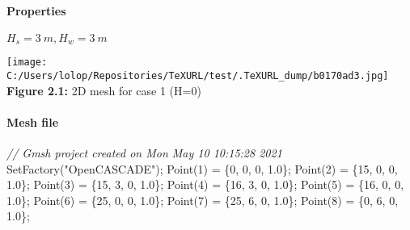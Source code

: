 \documentclass[11pt]{article}
\newenvironment{Shaded}{}{}
\newcommand{\DecValTok}[1]{\textcolor[rgb]{0.25,0.63,0.44}{{#1}}}
\newcommand{\FloatTok}[1]{\textcolor[rgb]{0.25,0.63,0.44}{{#1}}}
\newcommand{\StringTok}[1]{\textcolor[rgb]{0.25,0.44,0.63}{{#1}}}
\newcommand{\CommentTok}[1]{\textcolor[rgb]{0.38,0.63,0.69}{\textit{{#1}}}}
\newcommand{\NormalTok}[1]{{#1}}
\newcommand{\OperatorTok}[1]{\textcolor[rgb]{0.40,0.40,0.40}{{#1}}}
\begin{document}
\hypertarget{properties-1}{%
\paragraph{Properties}\label{properties-1}}

\(H_s = 3\ m, H_w = 3\ m\)

\texttt{[image: C:/Users/lolop/Repositories/TeXURL/test/.TeXURL\_dump/b0170ad3.jpg]} \textbf{Figure 2.1:}
2D mesh for case 1 (H=0)

\hypertarget{mesh-file}{%
\paragraph{Mesh file}\label{mesh-file}}

\begin{Shaded}
\begin{Highlighting}[]
\CommentTok{// Gmsh project created on Mon May 10 10:15:28 2021}
\NormalTok{SetFactory}\OperatorTok{(}\StringTok{"OpenCASCADE"}\OperatorTok{);}
\NormalTok{Point}\OperatorTok{(}\DecValTok{1}\OperatorTok{)} \OperatorTok{=} \OperatorTok{\{}\DecValTok{0}\OperatorTok{,} \DecValTok{0}\OperatorTok{,} \DecValTok{0}\OperatorTok{,} \FloatTok{1.0}\OperatorTok{\};}
\NormalTok{Point}\OperatorTok{(}\DecValTok{2}\OperatorTok{)} \OperatorTok{=} \OperatorTok{\{}\DecValTok{15}\OperatorTok{,} \DecValTok{0}\OperatorTok{,} \DecValTok{0}\OperatorTok{,} \FloatTok{1.0}\OperatorTok{\};}
\NormalTok{Point}\OperatorTok{(}\DecValTok{3}\OperatorTok{)} \OperatorTok{=} \OperatorTok{\{}\DecValTok{15}\OperatorTok{,} \DecValTok{3}\OperatorTok{,} \DecValTok{0}\OperatorTok{,} \FloatTok{1.0}\OperatorTok{\};}
\NormalTok{Point}\OperatorTok{(}\DecValTok{4}\OperatorTok{)} \OperatorTok{=} \OperatorTok{\{}\DecValTok{16}\OperatorTok{,} \DecValTok{3}\OperatorTok{,} \DecValTok{0}\OperatorTok{,} \FloatTok{1.0}\OperatorTok{\};}
\NormalTok{Point}\OperatorTok{(}\DecValTok{5}\OperatorTok{)} \OperatorTok{=} \OperatorTok{\{}\DecValTok{16}\OperatorTok{,} \DecValTok{0}\OperatorTok{,} \DecValTok{0}\OperatorTok{,} \FloatTok{1.0}\OperatorTok{\};}
\NormalTok{Point}\OperatorTok{(}\DecValTok{6}\OperatorTok{)} \OperatorTok{=} \OperatorTok{\{}\DecValTok{25}\OperatorTok{,} \DecValTok{0}\OperatorTok{,} \DecValTok{0}\OperatorTok{,} \FloatTok{1.0}\OperatorTok{\};}
\NormalTok{Point}\OperatorTok{(}\DecValTok{7}\OperatorTok{)} \OperatorTok{=} \OperatorTok{\{}\DecValTok{25}\OperatorTok{,} \DecValTok{6}\OperatorTok{,} \DecValTok{0}\OperatorTok{,} \FloatTok{1.0}\OperatorTok{\};}
\NormalTok{Point}\OperatorTok{(}\DecValTok{8}\OperatorTok{)} \OperatorTok{=} \OperatorTok{\{}\DecValTok{0}\OperatorTok{,} \DecValTok{6}\OperatorTok{,} \DecValTok{0}\OperatorTok{,} \FloatTok{1.0}\OperatorTok{\};}

\end{Highlighting}
\end{Shaded}
\end{document}
